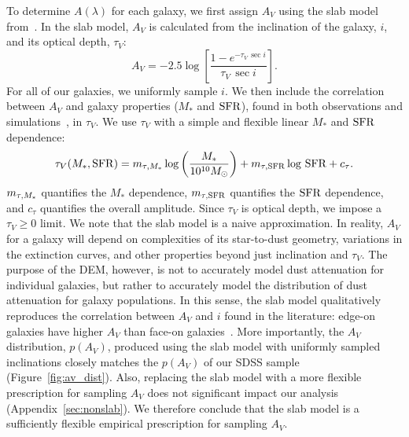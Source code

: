 To determine $A(\lambda)$ for each galaxy, we first assign $A_V$ using the slab
model from~\cite{somerville1999, somerville2012}. In the slab model, $A_V$ is
calculated from the inclination of the galaxy, $i$, and its optical depth, $\tau_V$: 
\begin{equation} \label{eq:slab}
    A_V = -2.5 \log \left[ \frac{1 - e^{-\tau_V\,\sec i}}{\tau_V\,\sec i} \right].
\end{equation}
For all of our galaxies, we uniformly sample $i$. We then include the
correlation between $A_V$ and galaxy properties ($M_*$ and ${\rm SFR}$), found
in both observations and simulations~\citep[\eg][]{narayanan2018, salim2020},
in $\tau_V$. We use $\tau_V$ with a simple and flexible linear $M_*$ and ${\rm SFR}$ 
dependence:
\begin{equation} \label{eq:tauv}
    \tau_V(M_*, {\rm SFR}) = m_{\tau,M_*} \log \left(\frac{M_*}{10^{10} M_\odot}\right) + m_{\tau,{\rm SFR}} \log\,{\rm SFR} + c_\tau.
\end{equation}
$m_{\tau,M_*}$ quantifies the $M_*$ dependence, $m_{\tau,{\rm SFR}}$ quantifies the ${\rm SFR}$
dependence, and $c_\tau$ quantifies the overall amplitude. Since $\tau_V$ is
optical depth, we impose a $\tau_V \ge 0$ limit. We note that the slab model 
is a naive approximation. In reality, $A_V$ for a galaxy will depend on complexities 
of its star-to-dust geometry, variations in the extinction curves, and other
properties beyond just inclination and $\tau_V$. The purpose of the DEM,
however, is not to accurately model dust attenuation for individual galaxies,
but rather to accurately model the distribution of dust attenuation for galaxy
populations. In this sense, the slab model qualitatively reproduces the
correlation between $A_V$ and $i$ found in the literature: edge-on galaxies
have higher $A_V$ than face-on galaxies~\citep[\eg][]{conroy2010, wild2011,
battisti2017, salim2020}. More
importantly, the $A_V$ distribution, $p(A_V)$, produced using the slab model with
uniformly sampled inclinations closely matches the $p(A_V)$ of our SDSS sample
(Figure~\ref{fig:av_dist}). Also, replacing the slab model with a more flexible
prescription for sampling $A_V$ does not significant
impact our analysis (Appendix~\ref{sec:nonslab}). We therefore conclude that
the slab model is a sufficiently flexible empirical prescription for sampling
$A_V$. 

